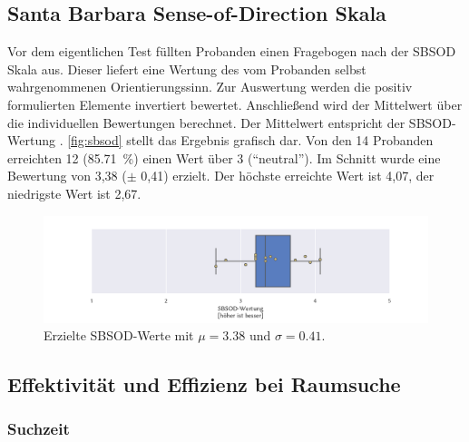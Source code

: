 \subsection{Santa Barbara Sense-of-Direction Skala}
Vor dem eigentlichen Test füllten Probanden einen Fragebogen nach der SBSOD Skala aus.
Dieser liefert eine Wertung des vom Probanden selbst wahrgenommenen Orientierungssinn.
Zur Auswertung werden die positiv formulierten Elemente invertiert bewertet.
Anschließend wird der Mittelwert über die individuellen Bewertungen berechnet.
Der Mittelwert entspricht der SBSOD-Wertung \parencite{Hegarty2002}.
\autoref{fig:sbsod} stellt das Ergebnis grafisch dar.
Von den 14 Probanden erreichten 12 (\SI{85,71}{\percent}) einen Wert über 3 (\enquote{neutral}).
Im Schnitt wurde eine Bewertung von 3,38 ($\pm$ 0,41) erzielt.
Der höchste erreichte Wert ist 4,07, der niedrigste Wert ist 2,67.
\begin{figure}[h]
    \centering
    \includegraphics[trim={3cm, 0, 2.5cm, 0}, clip, width=\linewidth]{figures/analysis/sbsod}
    \caption{Erzielte SBSOD-Werte mit $\mu = \num{3,38}$ und $\sigma = \num{0,41}$.}
    \label{fig:sbsod}
\end{figure}

\subsection{Effektivität und Effizienz bei Raumsuche}
\subsubsection*{Suchzeit}
\label{ssec:searchtime}

